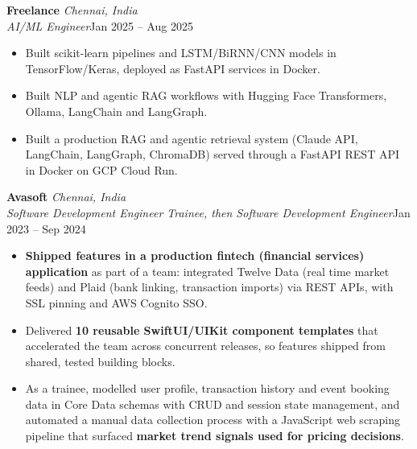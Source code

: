 \documentclass[a4paper,11pt]{article}
\newcommand{\role}[4]{%
  \textbf{#1}{\color{muted}\,\textperiodcentered\,\textit{#2}}\\
  \textit{#4}\hfill{\color{muted}#3}\par}
\newcommand{\gap}{\vspace{5pt}}
\newcommand{\num}[1]{\textbf{#1}}   %
\begin{document}
\gap
{}
\role{Freelance}{Chennai, India}{Jan 2025 – Aug 2025}{AI/ML Engineer}
\begin{itemize}
  \item Built scikit-learn pipelines and LSTM/BiRNN/CNN models in TensorFlow/Keras, deployed as FastAPI services in Docker.
  \item Built NLP and agentic RAG workflows with Hugging Face Transformers, Ollama, LangChain and LangGraph.
  \item Built a production RAG and agentic retrieval system (Claude API, LangChain, LangGraph, ChromaDB) served through a FastAPI REST API in Docker on GCP Cloud Run.
\end{itemize}
\gap
{}
\role{Avasoft}{Chennai, India}{Jan 2023 – Sep 2024}{Software Development Engineer Trainee, then Software Development Engineer}
\begin{itemize}
  \item \num{Shipped features in a production fintech (financial services) application} as part of a team: integrated Twelve Data (real time market feeds) and Plaid (bank linking, transaction imports) via REST APIs, with SSL pinning and AWS Cognito SSO.
  \item Delivered \num{10 reusable SwiftUI/UIKit component templates} that accelerated the team across concurrent releases, so features shipped from shared, tested building blocks.
  \item As a trainee, modelled user profile, transaction history and event booking data in Core Data schemas with CRUD and session state management, and automated a manual data collection process with a JavaScript web scraping pipeline that surfaced \num{market trend signals used for pricing decisions}.
\end{itemize}
\end{document}
